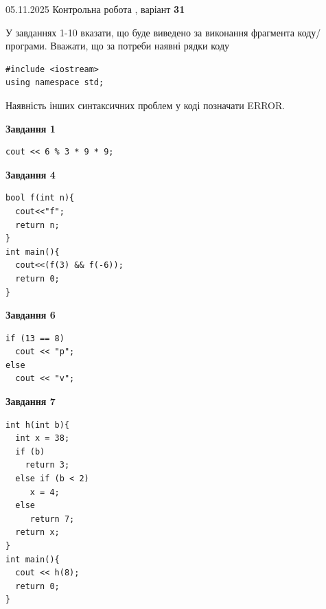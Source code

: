 \documentclass[12pt, ukrainian]{article}
\begin{document}
{\Large{05.11.2025 Контрольна робота , варіант  \No \textbf { 31 }\par}}
{
\begin {large}
У завданнях 1-10 вказати, що буде виведено за виконання фрагмента коду/про\-гра\-ми.
Вважати, що за потреби наявні рядки коду
\begin{verbatim}
#include <iostream>
using namespace std;
\end{verbatim}
Наявність інших синтаксичних проблем у коді позначати ERROR.

\begin{minipage}[t]{7.0cm}

\begin{center}
\textbf{Завдання 1}
\end{center}
\vspace{-8mm}

\begin{verbatim}
cout << 6 % 3 * 9 * 9;
\end{verbatim}



\begin{center}
\textbf{Завдання 4}
\end{center}
\vspace{-8mm}

\begin{verbatim}
bool f(int n){
  cout<<"f";
  return n;
}
int main(){
  cout<<(f(3) && f(-6));
  return 0;
}
\end{verbatim}



\begin{center}
\textbf{Завдання 6}
\end{center}
\vspace{-8mm}

\begin{verbatim}
if (13 == 8)
  cout << "p";
else
  cout << "v";
\end{verbatim}



\begin{center}
\textbf{Завдання 7}
\end{center}
\vspace{-8mm}

\begin{verbatim}
int h(int b){
  int x = 38;
  if (b)
    return 3;
  else if (b < 2)
     x = 4;
  else
     return 7;
  return x;
}
int main(){
  cout << h(8);
  return 0;
}
\end{verbatim}


\end{minipage}
\end{large}}
\end{document}
